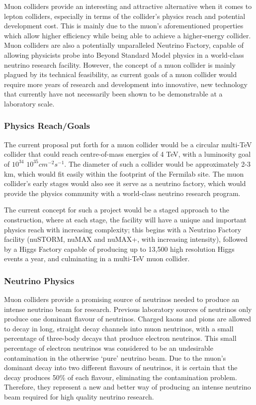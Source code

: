 Muon colliders provide an interesting and attractive alternative when it comes to lepton colliders, especially in terms of the collider's physics reach and potential development cost. This is mainly due to the muon's aforementioned properties which allow higher efficiency while being able to achieve a higher-energy collider. Muon colliders are also a potentially unparalleled Neutrino Factory, capable of allowing physicists probe into Beyond Standard Model physics in a world-class neutrino research facility. However, the concept of a muon collider is mainly plagued by its technical feasibility, as current goals of a muon collider would require more years of research and development into innovative, new technology that currently have not necessarily been shown to be demonstrable at a laboratory scale.
 
\subsubsection{Physics Reach/Goals}
 
The current proposal put forth for a muon collider would be a circular multi-TeV collider that could reach centre-of-mass energies of 4 TeV, with a luminosity goal of $10^{34}$ \textendash $10^{35} cm^{-2} s^{-1}$. The diameter of such a collider would be approximately 2-3 km, which would fit easily within the footprint of the Fermilab site. The muon collider's early stages would also see it serve as a neutrino factory, which would provide the physics community with a world-class neutrino research program.
 
The current concept for such a project would be a staged approach to the construction, where at each stage, the facility will have a unique and important physics reach with increasing complexity; this begins with a Neutrino Factory facility (nuSTORM, nuMAX and nuMAX+, with increasing intensity), followed by a Higgs Factory capable of producing up to 13,500 high resolution Higgs events a year, and culminating in a multi-TeV muon collider.
 
\subsubsection{Neutrino Physics}
 
Muon colliders provide a promising source of neutrinos needed to produce an intense neutrino beam for research. Previous laboratory sources of neutrinos only produce one dominant flavour of neutrinos. Charged kaons and pions are allowed to decay in long, straight decay channels into muon neutrinos, with a small percentage of three-body decays that produce electron neutrinos. This small percentage of electron neutrinos was considered to be an undesirable contamination in the otherwise `pure' neutrino beam. Due to the muon's dominant decay into two different flavours of neutrinos, it is certain that the decay produces 50\% of each flavour, eliminating the contamination problem. Therefore, they represent a new and better way of producing an intense neutrino beam required for high quality neutrino research.
 

